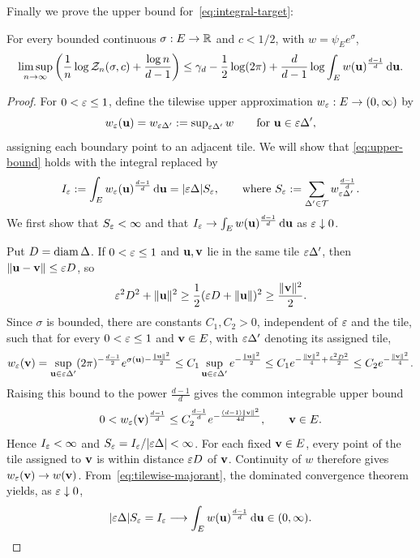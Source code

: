 \documentclass[11pt,letterpaper]{article}
\begin{document}
Finally we prove the upper bound for~\eqref{eq:integral-target}:
\begin{lemma}\label{lem:upper}
      For every bounded continuous $\sigma:E\to\mathbb R$ and $c<1/2$, with $w=\psi_Ee^\sigma$,
      \begin{equation}\label{eq:upper-bound}
            \limsup_{n\to\infty}\left(\frac1n\log\mathcal Z_n(\sigma,c)+\frac{\log n}{d-1}\right)
            \le\gamma_d-\frac12\log(2\pi)+\frac d{d-1}\log\int_Ew(\mathbf u)^{\frac{d-1}{d}}\,\mathrm d\mathbf u.
      \end{equation}
\end{lemma}
\begin{proof}
      For $0<\varepsilon\le 1$, define the tilewise upper approximation $w_\varepsilon:E\to(0,\infty)$ by
      \[
            w_\varepsilon(\mathbf u)=w_{\varepsilon\Delta'}:=\sup\nolimits_{\varepsilon\Delta'}w
            \qquad\text{for }\mathbf u\in\varepsilon\Delta',
      \]
      assigning each boundary point to an adjacent tile.
      We will show that \eqref{eq:upper-bound} holds with the integral replaced by
      \[I_\varepsilon:=\int_E w_\varepsilon(\mathbf u)^{\frac{d-1}{d}}\,\mathrm d\mathbf u =
            |\varepsilon\Delta|S_\varepsilon,\qquad \text{where }
            S_\varepsilon:=\sum_{\Delta'\in\mathcal T}w_{\varepsilon \Delta'}^{\frac{d-1}{d}}.
      \]
      We first show that $S_\varepsilon<\infty$ and that $I_\varepsilon\to\int_Ew(\mathbf u)^{\frac{d-1}{d}}\,\mathrm d\mathbf u$ as $\varepsilon\downarrow0$.

      Put $D=\operatorname{diam}\Delta$. If $0<\varepsilon\le1$ and $\mathbf u,\mathbf v$ lie in the same tile $\varepsilon\Delta'$, then $\|\mathbf u-\mathbf v\|\leq \varepsilon D$, so
      \[\varepsilon^2 D^2+\|\mathbf u\|^2\ge \frac12(\varepsilon D+\|\mathbf u\|)^2\ge\frac{\|\mathbf v\|^2}{2}.\] Since $\sigma$ is bounded, there are constants $C_1,C_2>0$, independent of $\varepsilon$ and the tile, such that for every $0<\varepsilon\le1$ and $\mathbf v\in E$, with $\varepsilon\Delta'$ denoting its assigned tile,
      \[
            w_\varepsilon(\mathbf v)=\sup_{\mathbf u\in \varepsilon\Delta'}(2\pi)^{-\frac{d-1}{2}}e^{\sigma(\mathbf u)-\frac{\|\mathbf u\|^{2}}{2}}\leq C_{1}\sup_{\mathbf u\in \varepsilon\Delta'}e^{-\frac{\|\mathbf u\|^{2}}{2}}\leq C_{1} e^{-\frac{\|\mathbf v\|^{2}}{4}+\frac{\varepsilon^2 D^2}{2}}\leq C_2 e^{-\frac{\|\mathbf v\|^{2}}{4}}.
      \]
      Raising this bound to the power $\frac{d-1}{d}$ gives the common integrable upper bound
      \begin{equation}\label{eq:tilewise-majorant}
            0<w_\varepsilon(\mathbf v)^{\frac{d-1}{d}}\le C_{2}^{\frac{d-1}{d}} e^{-\frac{(d-1)\|\mathbf v\|^2}{4d}},\qquad \mathbf v\in E.
      \end{equation}
      Hence $I_\varepsilon<\infty$ and $S_\varepsilon=I_\varepsilon/|\varepsilon\Delta|<\infty$. For each fixed $\mathbf v\in E$, every point of the tile assigned to $\mathbf v$ is within distance $\varepsilon D$ of $\mathbf v$. Continuity of $w$ therefore gives $w_\varepsilon(\mathbf v)\to w(\mathbf v)$. From~\eqref{eq:tilewise-majorant}, the dominated convergence theorem yields, as $\varepsilon\downarrow0$,
      \begin{equation}\label{eq:tilewise-integral-limit}
            |\varepsilon\Delta|S_\varepsilon=I_\varepsilon\longrightarrow
            \int_Ew(\mathbf u)^{\frac{d-1}{d}}\,\mathrm d\mathbf u\in(0,\infty).
      \end{equation}
      

\end{proof}
\end{document}
